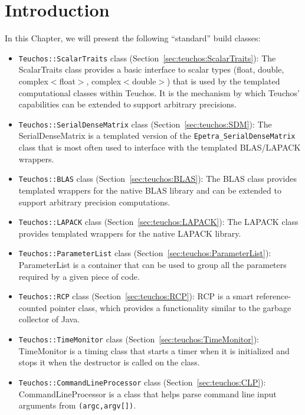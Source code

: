 \section{Introduction}

In this Chapter, we will present the following ``standard'' build classes:
\begin{itemize}

\item \verb!Teuchos::ScalarTraits! class (Section~\ref{sec:teuchos:ScalarTraits}):
  The ScalarTraits class provides a basic interface to scalar types (float, double, 
  complex$<$float$>$, complex$<$double$>$) that is used by the templated computational
  classes within Teuchos.  It is the mechanism by which Teuchos' capabilities 
  can be extended to support arbitrary precisions.

\item \verb!Teuchos::SerialDenseMatrix! class (Section~\ref{sec:teuchos:SDM}): 
  The SerialDenseMatrix is a templated version of the \verb!Epetra_SerialDenseMatrix! class
  that is most often used to interface with the templated BLAS/LAPACK wrappers.

\item \verb!Teuchos::BLAS! class (Section~\ref{sec:teuchos:BLAS}):
  The BLAS class provides templated wrappers
  for the native BLAS library and can be extended to support arbitrary precision
  computations.  

\item \verb!Teuchos::LAPACK! class (Section~\ref{sec:teuchos:LAPACK}):
  The LAPACK class provides templated wrappers for the native LAPACK library.

\item \verb!Teuchos::ParameterList! class (Section~\ref{sec:teuchos:ParameterList}):
  ParameterList is a container that can be used to group all the parameters required by a
  given piece of code.

\item \verb!Teuchos::RCP! class (Section~\ref{sec:teuchos:RCP}):
  RCP is a smart reference-counted pointer class, which provides a functionality
  similar to the garbage collector of Java. 

\item \verb!Teuchos::TimeMonitor! class (Section~\ref{sec:teuchos:TimeMonitor}):
  TimeMonitor is a timing class that starts a timer when it is initialized and
  stops it when the destructor is called on the class.

\item \verb!Teuchos::CommandLineProcessor! class (Section~\ref{sec:teuchos:CLP}): 
  CommandLineProcessor is a class that helps parse command line input arguments from 
  \verb!(argc,argv[])!.   
\end{itemize}

